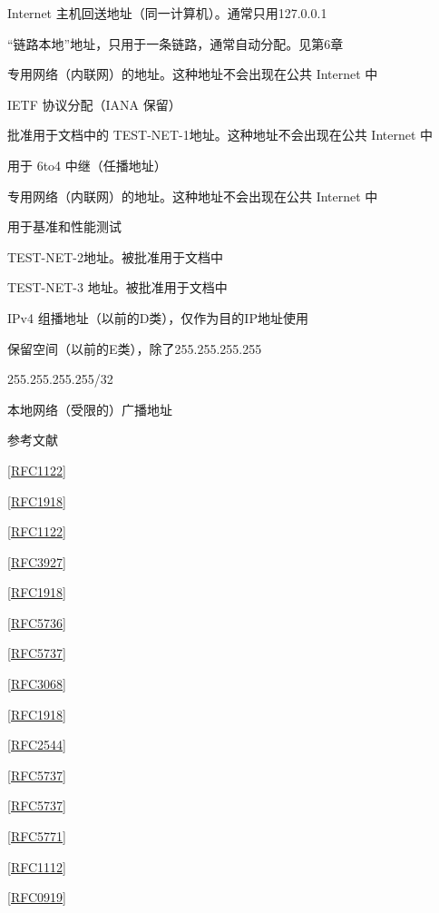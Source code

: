Internet 主机回送地址（同一计算机）。通常只用127.0.0.1

“链路本地”地址，只用于一条链路，通常自动分配。见第6章

专用网络（内联网）的地址。这种地址不会出现在公共 Internet 中

IETF 协议分配（IANA 保留）

批准用于文档中的 TEST-NET-1地址。这种地址不会出现在公共 Internet 中

用于 6to4 中继（任播地址）

专用网络（内联网）的地址。这种地址不会出现在公共 Internet 中

用于基准和性能测试

TEST-NET-2地址。被批准用于文档中

TEST-NET-3 地址。被批准用于文档中

IPv4 组播地址（以前的D类），仅作为目的IP地址使用

保留空间（以前的E类），除了255.255.255.255

255.255.255.255/32

本地网络（受限的）广播地址

参考文献

\href{https://www.rfc-editor.org/rfc/rfc1122}{[RFC1122]}

\href{https://www.rfc-editor.org/rfc/rfc1918}{[RFC1918]}

\href{https://www.rfc-editor.org/rfc/rfc1122}{[RFC1122]}

\href{https://www.rfc-editor.org/rfc/rfc3927}{[RFC3927]}

\href{https://www.rfc-editor.org/rfc/rfc1918}{[RFC1918]}

\href{https://www.rfc-editor.org/rfc/rfc5736}{[RFC5736]}

\href{https://www.rfc-editor.org/rfc/rfc5737}{[RFC5737]}

\href{https://www.rfc-editor.org/rfc/rfc3068}{[RFC3068]}

\href{https://www.rfc-editor.org/rfc/rfc1918}{[RFC1918]}

\href{https://www.rfc-editor.org/rfc/rfc2544}{[RFC2544]}

\href{https://www.rfc-editor.org/rfc/rfc5737}{[RFC5737]}

\href{https://www.rfc-editor.org/rfc/rfc5737}{[RFC5737]}

\href{https://www.rfc-editor.org/rfc/rfc5771}{[RFC5771]}

\href{https://www.rfc-editor.org/rfc/rfc1112}{[RFC1112]}

\href{https://www.rfc-editor.org/rfc/rfc0919}{[RFC0919]}


